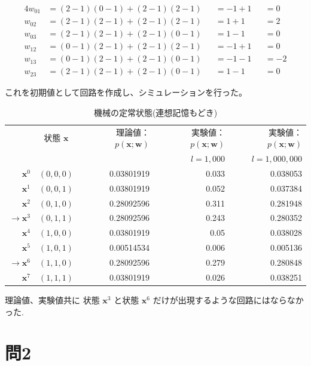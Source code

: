 \documentclass[a4j, uplatex, fleqn, dvipdfmx]{jsarticle} %
\begin{document}
\begin{alignat*}{4}
  w_{01} &= (2-1)(0-1) + (2-1)(2-1) & &= -1 +1 & &=  0 \\
  w_{02} &= (2-1)(2-1) + (2-1)(2-1) & &=  1 +1 & &=  2 \\
  w_{03} &= (2-1)(2-1) + (2-1)(0-1) & &=  1 -1 & &=  0 \\
  w_{12} &= (0-1)(2-1) + (2-1)(2-1) & &= -1 +1 & &=  0 \\
  w_{13} &= (0-1)(2-1) + (2-1)(0-1) & &= -1 -1 & &= -2 \\
  w_{23} &= (2-1)(2-1) + (2-1)(0-1) & &=  1 -1 & &=  0
\end{alignat*}

これを初期値として回路を作成し、シミュレーションを行った。

\begin{table}[htb]
  \caption{機械の定常状態(連想記憶もどき)}
  \label{table:q1_c}
  \centering
  \begin{tabular}{|r|c|r|r|r|}
    \hline
     & 状態 $\bm{x}$ & 理論値： $p(\bm{x} ; \bm{w})$ & 実験値： $p(\bm{x} ; \bm{w})$ & 実験値： $p(\bm{x} ; \bm{w})$ \\
     & & & $l=1,000$ & $l=1,000,000$ \\
    \hline
    $            \bm{x}^{0}$ & $(0,0,0)$ & 0.03801919 & 0.033 & 0.038053 \\
    $            \bm{x}^{1}$ & $(0,0,1)$ & 0.03801919 & 0.052 & 0.037384 \\
    $            \bm{x}^{2}$ & $(0,1,0)$ & 0.28092596 & 0.311 & 0.281948 \\
    $\rightarrow \bm{x}^{3}$ & $(0,1,1)$ & 0.28092596 & 0.243 & 0.280352 \\
    $            \bm{x}^{4}$ & $(1,0,0)$ & 0.03801919 & 0.05  & 0.038028 \\
    $            \bm{x}^{5}$ & $(1,0,1)$ & 0.00514534 & 0.006 & 0.005136 \\
    $\rightarrow \bm{x}^{6}$ & $(1,1,0)$ & 0.28092596 & 0.279 & 0.280848 \\
    $            \bm{x}^{7}$ & $(1,1,1)$ & 0.03801919 & 0.026 & 0.038251 \\
    \hline
  \end{tabular}
\end{table}

理論値、実験値共に
状態 $\bm{x}^3$ と状態 $\bm{x}^6$ だけが出現するような回路にはならなかった.

\section{問2}
\end{document}
